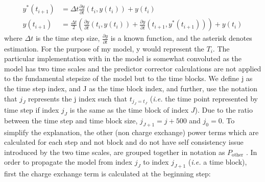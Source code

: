 \begin{align}
    y^*(t_{i+1}) &= \Delta t\frac{\partial y}{\partial t}(t_i, y(t_i)) + y(t_i)\\
    y(t_{i+1}) &= \frac{\Delta t}{2} \left(\frac{\partial y}{\partial t}(t_i, y(t_i)) + \frac{\partial y}{\partial t}(t_{i+1}, y^*(t_{i+1})) \right) + y(t_i)
\end{align}
where $\Delta t$ is the time step size, $\frac{\partial y}{\partial t}$ is a known function, and the asterisk denotes estimation. For the purpose of my model, y would represent the $T_i$. The particular implementation with in the model is somewhat convoluted as the model has two time scales and the predictor corrector calculations are not applied to the fundamental stepsize of the model but to the time blocks. We define j as the time step index, and J as the time block index, and further, use the notation that $j_{J}$ represents the j index such that $t_{j_{J} = t_{J}}$ (\textit{i.e.} the time point represented by time step if index $j_{J}$ is the same as the time block of index $J$). Due to the ratio between the time step and time block size, $j_{J+1} = j+500$ and $j_0 = 0$. To simplify the explanation, the other (non charge exchange) power terms which are calculated for each step and not block and do not have self consistency issue introduced by the two time scales, are grouped together in notation as $P_{\text{other}}$ . In order to propagate the model from index $j_J$ to index $j_{J+1}$ (\textit{i.e.} a time block), first the charge exchange term is calculated at the beginning step:

